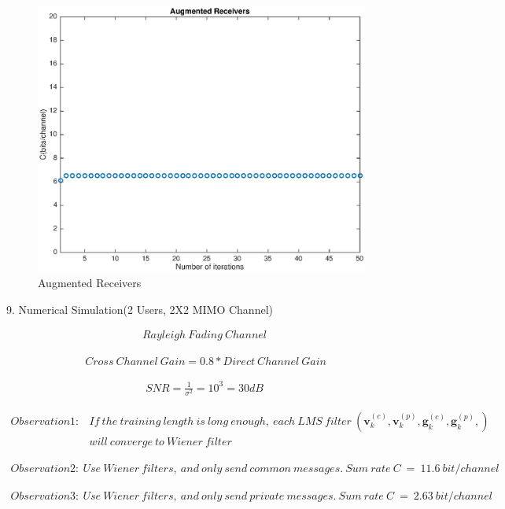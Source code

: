 \documentclass[11pt, oneside]{article}   	%
\begin{document}
\begin{figure}[h]
    \centering
    \centerline{\includegraphics[width=110mm]{Augmented_Receivers}}
    \caption{Augmented Receivers}
\end{figure} 





\newpage

9. Numerical Simulation(2 Users, 2X2 MIMO Channel)


\begin{align*}
Rayleigh\ Fading\ Channel
\end{align*}

\begin{align*}
\ Cross\ Channel\ Gain = 0.8*Direct\ Channel\ Gain
\end{align*}

\begin{align*}
SNR = \frac {1}{\sigma^2} = 10^3=30dB
\end{align*}

\begin{align*}
Observation1: &If\ the\ training\ length\ is\ long\ enough,\ each\ LMS\ filter\ (\textbf{v}^{(c)}_{k},\textbf{v}^{(p)}_{k},\textbf{g}^{(c)}_{k},\textbf{g}^{(p)}_{k},)\\
&will\ converge\ to\ Wiener\ filter
\end{align*}

\begin{align*}
Observation2:\ Use\ Wiener\ filters,\ and\ only\ send\ common\ messages.\ Sum\ rate\ C\ =\ 11.6\ bit/channel
\end{align*}

\begin{align*}
Observation3:\ Use\ Wiener\ filters,\ and\ only\ send\ private\ messages.\ Sum\ rate\ C\ =\ 2.63\ bit/channel
\end{align*}
\end{document}
